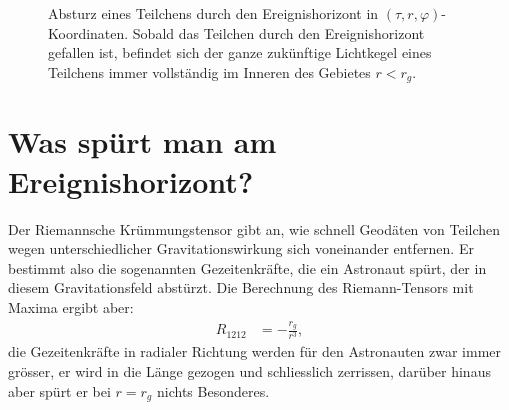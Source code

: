 \begin{figure}
\centering
\caption{Absturz eines Teilchens durch den Ereignishorizont in
$(\tau,r,\varphi)$-Koordinaten.
Sobald das Teilchen durch den Ereignishorizont gefallen ist,
befindet sich der ganze zukünftige Lichtkegel eines Teilchens 
immer vollständig im Inneren des Gebietes $r<r_g$.
\label{skript:kruemmung:fig:blackhole}}
\end{figure}


\section{Was spürt man am Ereignishorizont?%
\label{skript:section:wasspuertman}}
Der Riemannsche Krümmungstensor gibt an, wie schnell Geodäten von Teilchen
wegen unterschiedlicher Gravitationswirkung sich voneinander entfernen.
Er bestimmt also die sogenannten Gezeitenkräfte, die ein Astronaut spürt,
der in diesem Gravitationsfeld abstürzt.
%
Die Berechnung des Riemann-Tensors mit Maxima ergibt aber:
\begin{align*}
R_{1212}&=-\frac{r_g}{r^3},
\end{align*}
die Gezeitenkräfte in radialer Richtung werden für den Astronauten
zwar immer grösser, er wird in die Länge gezogen und schliesslich 
zerrissen, darüber hinaus aber spürt er bei $r=r_g$ nichts Besonderes.
%

